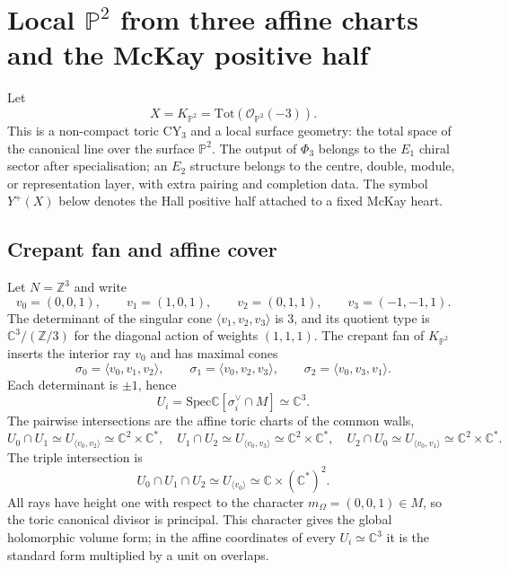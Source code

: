 \providecommand{\P}{\mathbb{P}}
\providecommand{\C}{\mathbb{C}}
\providecommand{\Z}{\mathbb{Z}}
\providecommand{\cO}{\mathcal{O}}
\providecommand{\cH}{\mathcal{H}}
\providecommand{\fgl}{\mathfrak{gl}}
\providecommand{\CoHA}{\mathrm{CoHA}}
\providecommand{\Tot}{\mathrm{Tot}}
\providecommand{\Crit}{\mathrm{Crit}}
\providecommand{\tr}{\mathrm{tr}}
\providecommand{\Spec}{\mathrm{Spec}}

\section*{Local $\P^2$ from three affine charts and the McKay positive half}
\label{sec:local-p2-three-charts}

Let
\[
 X = K_{\P^2}=\Tot(\cO_{\P^2}(-3)).
\]
This is a non-compact toric CY$_3$ and a local surface geometry: the
total space of the canonical line over the surface $\P^2$. The output of
$\Phi_3$ belongs to the $E_1$ chiral sector after specialisation; an
$E_2$ structure belongs to the centre, double, module, or representation
layer, with extra pairing and completion data. The symbol $Y^+(X)$ below
denotes the Hall positive half attached to a fixed McKay heart.

\subsection*{Crepant fan and affine cover}

Let $N=\Z^3$ and write
\[
 v_0=(0,0,1),\qquad
 v_1=(1,0,1),\qquad
 v_2=(0,1,1),\qquad
 v_3=(-1,-1,1).
\]
The determinant of the singular cone $\langle v_1,v_2,v_3\rangle$ is
$3$, and its quotient type is $\C^3/(\Z/3)$ for the diagonal action of
weights $(1,1,1)$.
The crepant fan of $K_{\P^2}$ inserts the interior ray $v_0$ and has
maximal cones
\[
 \sigma_0=\langle v_0,v_1,v_2\rangle,\qquad
 \sigma_1=\langle v_0,v_2,v_3\rangle,\qquad
 \sigma_2=\langle v_0,v_3,v_1\rangle .
\]
Each determinant is $\pm1$, hence
\[
 U_i=\Spec \C[\sigma_i^\vee\cap M]\simeq \C^3.
\]
The pairwise intersections are the affine toric charts of the common
walls,
\[
 U_0\cap U_1\simeq U_{\langle v_0,v_2\rangle}\simeq \C^2\times\C^*,
 \quad
 U_1\cap U_2\simeq U_{\langle v_0,v_3\rangle}\simeq \C^2\times\C^*,
 \quad
 U_2\cap U_0\simeq U_{\langle v_0,v_1\rangle}\simeq \C^2\times\C^*.
\]
The triple intersection is
\[
 U_0\cap U_1\cap U_2\simeq U_{\langle v_0\rangle}
 \simeq \C\times(\C^*)^2.
\]
All rays have height one with respect to the character
$m_\Omega=(0,0,1)\in M$, so the toric canonical divisor is principal.
This character gives the global holomorphic volume form; in the affine
coordinates of every $U_i\simeq\C^3$ it is the standard form multiplied
by a unit on overlaps.

